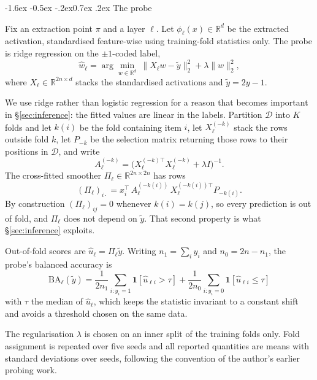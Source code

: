 \documentclass[10pt,twocolumn,letterpaper]{article}
\makeatletter
\renewcommand\subsection{\@startsection{subsection}{2}{\z@}%
  {-1.6ex \@plus -0.5ex \@minus -.2ex}{0.7ex \@plus .2ex}%
  {\normalfont\normalsize\bfseries}}
\newcommand{\BA}{\mathrm{BA}}
\newcommand{\Real}{\mathbb{R}}
\makeatother
\begin{document}
\subsection{The probe}

Fix an extraction point $\pi$ and a layer $\ell$. Let $\phi_\ell(x)\in\Real^d$ be the extracted activation, standardised feature-wise using training-fold statistics only. The probe is ridge regression on the $\pm 1$-coded label,
\begin{equation}
\hat w_\ell = \arg\min_{w\in\Real^d}\ \|X_\ell w - \tilde y\|_2^2 + \lambda\|w\|_2^2 ,
\label{eq:ridge}
\end{equation}
where $X_\ell\in\Real^{2n\times d}$ stacks the standardised activations and $\tilde y = 2y-1$.

We use ridge rather than logistic regression for a reason that becomes important in \S\ref{sec:inference}: the fitted values are linear in the labels. Partition $\mathcal{D}$ into $K$ folds and let $k(i)$ be the fold containing item $i$, let $X^{(-k)}_\ell$ stack the rows outside fold $k$, let $P_{-k}$ be the selection matrix returning those rows to their positions in $\mathcal{D}$, and write
\begin{equation}
A^{(-k)}_\ell = \big(X_{\ell}^{(-k)\top}X_{\ell}^{(-k)}+\lambda I\big)^{-1}.
\end{equation}
The cross-fitted smoother $\Pi_\ell\in\Real^{2n\times 2n}$ has rows
\begin{equation}
(\Pi_\ell)_{i\cdot} = x_{i}^{\top}\,A^{(-k(i))}_\ell\,X_{\ell}^{(-k(i))\top}P_{-k(i)} .
\label{eq:smoother}
\end{equation}
By construction $(\Pi_\ell)_{ij}=0$ whenever $k(i)=k(j)$, so every prediction is out of fold, and $\Pi_\ell$ does not depend on $\tilde y$. That second property is what \S\ref{sec:inference} exploits.

Out-of-fold scores are $\hat u_\ell = \Pi_\ell \tilde y$. Writing $n_1=\sum_i y_i$ and $n_0=2n-n_1$, the probe's balanced accuracy is
\begin{equation}
\BA_\ell(\tilde y) = \frac{1}{2n_1}\sum_{i:y_i=1}\!\mathbf{1}[\hat u_{\ell i}>\tau]
 + \frac{1}{2n_0}\sum_{i:y_i=0}\!\mathbf{1}[\hat u_{\ell i}\le\tau]
\label{eq:ba}
\end{equation}
with $\tau$ the median of $\hat u_\ell$, which keeps the statistic invariant to a constant shift and avoids a threshold chosen on the same data.

The regularisation $\lambda$ is chosen on an inner split of the training folds only. Fold assignment is repeated over five seeds and all reported quantities are means with standard deviations over seeds, following the convention of the author's earlier probing work.
\end{document}
